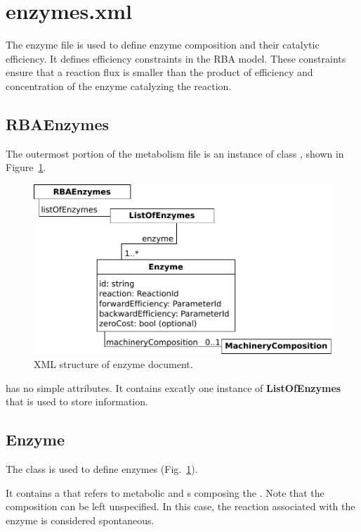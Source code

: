
\section{enzymes.xml}

The enzyme file is used to define enzyme composition and their catalytic efficiency.
It defines efficiency constraints in the RBA model.
These constraints ensure that a reaction flux is smaller than
the product of efficiency and concentration of the enzyme catalyzing
the reaction.

\subsection{RBAEnzymes}
\label{sec:rba_enzymes}

The outermost portion of the metabolism file is an instance of class
\rbaenzymes, shown in Figure~\ref{fig:enzymes_doc}.

\begin{figure}
  \centering
  \includegraphics[scale=0.8]{figures/enzymes_doc}
  \caption{XML structure of enzyme document.}
\label{fig:enzymes_doc}
\end{figure}

\rbaenzymes{} has no simple attributes.
It contains excatly one instance of \textbf{ListOfEnzymes} that is used
to store \enzyme{} information.


\subsection{Enzyme}
\label{sec:enzyme}

The \enzyme{} class is used to define enzymes
(Fig.~\ref{fig:enzymes_doc}).

It contains a \machinerycomposition{} that refers to metabolic \species{}
and \macromolecule{}s composing the \enzyme{}.
Note that the composition can be left unspecified.
In this case, the reaction associated with the enzyme is considered spontaneous.

